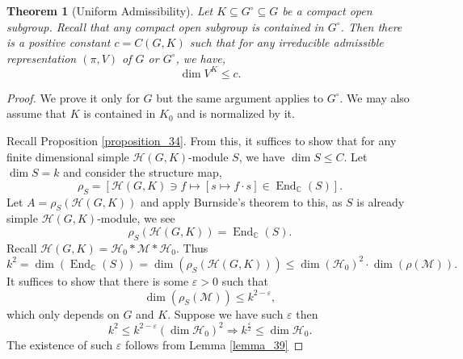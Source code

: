 \documentclass[8pt]{article}
\newtheorem{theorem}{Theorem} [section]
\DeclareMathOperator{\End}{End}
\newcommand{\C}[0]{\mathbb{C}}
\newcommand{\hecke}[0]{\mathscr{H}}
\begin{document}
\begin{theorem}[Uniform Admissibility]
  \label{theorem_38}
  Let $K\subseteq G^\circ \subseteq G$ be a compact open subgroup. Recall that any compact open subgroup is contained in $G^\circ$.
  Then there is a positive constant $c=C(G,K)$ such that for any irreducible admissible representation $(\pi,V)$ of $G$ or $G^\circ$, we have,
  \begin{equation*}
    \dim V^K\leq c.
  \end{equation*}
\end{theorem}
\begin{proof}
  We prove it only for $G$ but the same argument applies to $G^\circ$. We may also assume that $K$ is contained in $K_0$ and is normalized by it.
  \par Recall Proposition \ref{proposition_34}. From this, it suffices to show that for any finite dimensional simple $\hecke(G,K)$-module $S$, we have $\dim S\leq C$. Let $\dim S = k$ and consider the structure map,
  \begin{equation*}
    \rho_S = [\hecke(G,K)\ni f\mapsto [s\mapsto f\cdot s]\in\End_\C(S)].
  \end{equation*}
  Let $A=\rho_S(\hecke(G,K))$ and apply Burnside's theorem to this, as $S$ is already simple $\hecke(G,K)$-module, we see 
  \begin{equation*}
    \rho_S(\hecke(G,K)) = \End_\C(S).
  \end{equation*}
  Recall $\hecke(G,K) = \hecke_0\ast\mathcal{M}\ast\hecke_0$. Thus 
  \begin{equation*}
    k^2 = \dim(\End_\C(S)) = \dim(\rho_S(\hecke(G,K))) \leq \dim(\hecke_0)^2\cdot\dim(\rho(\mathcal{M})).
  \end{equation*}
  It suffices to show that there is some $\varepsilon>0$ such that 
  \begin{equation*}
    \dim(\rho_S(\mathcal{M}))\leq k^{2-\varepsilon},
  \end{equation*}
  which only depends on $G$ and $K$. Suppose we have such $\varepsilon$ then 
  \begin{equation*}
    k^2\leq k^{2-\varepsilon}(\dim\hecke_0)^2\Rightarrow k^{{\frac \varepsilon 2}}\leq \dim\hecke_0.
  \end{equation*}
  The existence of such $\varepsilon$ follows from Lemma \ref{lemma_39}
\end{proof}
\end{document}
